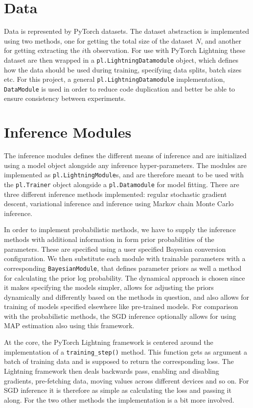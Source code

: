 \section{Data}
Data is represented by PyTorch datasets.
The dataset abstraction is implemented using two methods, one for getting the total size of the dataset $N$, and another for getting extracting the $i$th observation.
For use with PyTorch Lightning these dataset are then wrapped in a \texttt{pl.LightningDatamodule} object, which defines how the data should be used during training, specifying data splits, batch sizes etc.
For this project, a general \texttt{pl.LightningDatamodule} implementation, \texttt{DataModule} is used in order to reduce code duplication and better be able to ensure consistency between experiments. 

\section{Inference Modules}
The inference modules defines the different means of inference and are initialized using a model object alongside any inference hyper-parameters.
The modules are implemented as \texttt{pl.LightningModule}s, and are therefore meant to be used with the \texttt{pl.Trainer} object alongside a \texttt{pl.Datamodule} for model fitting. 
There are three different inference methods implemented: regular stochastic gradient descent, variational inference and inference using Markov chain Monte Carlo inference.

In order to implement probabilistic methods, we have to supply the inference methods with additional information in form prior probabilities of the parameters. 
These are specified using a user specified Bayesian conversion configuration.
We then substitute each module with trainable parameters with a corresponding \texttt{BayesianModule}, that defines parameter priors as well a method for calculating the prior log probability.
The dynamical approach is chosen since it makes specifying the models simpler, allows for adjusting the priors dynamically and differently based on the methods in question, and also allows for training of models specified elsewhere like pre-trained models. 
For comparison with the probabilistic methods, the SGD inference optionally allows for using MAP estimation also using this framework.

At the core, the PyTorch Lightning framework is centered around the implementation of a \texttt{training\_step()} method.
This function gets as argument a batch of training data and is supposed to return the corresponding loss.
The Lightning framework then deals backwards pass, enabling and disabling gradients, pre-fetching data, moving values across different devices and so on.
For SGD inference it is therefore as simple as calculating the loss and passing it along.
For the two other methods the implementation is a bit more involved.


